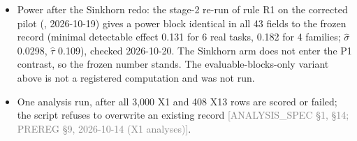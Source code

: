 \documentclass[11pt]{article}
\newcommand{\src}[1]{{\scriptsize\textcolor{gray}{[#1]}}}
\begin{document}
\begin{itemize}
\item Power after the Sinkhorn redo: the stage-2 re-run of rule R1 on the corrected pilot (, 2026-10-19) gives a power block identical in all 43 fields to the frozen record (minimal detectable effect 0.131 for 6 real tasks, 0.182 for 4 families; $\hat\sigma$ 0.0298, $\hat\tau$ 0.109), checked 2026-10-20. The Sinkhorn arm does not enter the P1 contrast, so the frozen number stands. The evaluable-blocks-only variant above is not a registered computation and was not run.
\item One analysis run, after all 3,000 X1 and 408 X13 rows are scored or failed; the script refuses to overwrite an existing record \src{ANALYSIS\_SPEC \S1, \S14; PREREG \S9, 2026-10-14 (X1 analyses)}.
\end{itemize}
\end{document}
